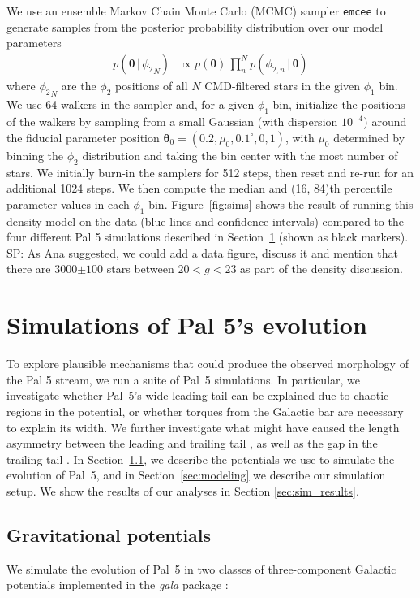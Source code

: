 \documentclass[twocolumn]{aastex62}
\newcommand{\package}[1]{\textsl{#1}}
\newcommand{\bs}[1]{\boldsymbol{#1}}
\newcommand{\given}{\,|\,}
\newcommand{\sa}[1]{{\color{magenta} SP: #1}}
\begin{document}
We use an ensemble Markov Chain Monte Carlo (MCMC) sampler \texttt{emcee} \citep{Foreman-Mackey:2013} to generate samples from the posterior probability distribution over our model parameters
\begin{align}
    p(\bs{\theta} \given {\phi_2}_N) &\propto
        p(\bs{\theta}) \, \prod_n^N p(\phi_{2, n} \given \bs{\theta})
\end{align}
where ${\phi_2}_N$ are the $\phi_2$ positions of all $N$ CMD-filtered stars in the given $\phi_1$ bin.
We use 64 walkers in the sampler and, for a given $\phi_1$ bin, initialize the positions of the walkers by sampling from a small Gaussian (with dispersion $10^{-4}$) around the fiducial parameter position $\bs{\theta}_0 = (0.2, \mu_0, 0.1^\circ, 0, 1)$, with $\mu_0$ determined by binning the $\phi_2$ distribution and taking the bin center with the most number of stars.
We initially burn-in the samplers for 512 steps, then reset and re-run for an additional 1024 steps.
We then compute the median and (16, 84)th percentile parameter values in each $\phi_1$ bin.
Figure~\ref{fig:sims} shows the result of running this density model on the data (blue lines and confidence intervals) compared to the four different Pal 5 simulations described in Section~\ref{sec:sim} (shown as black markers). \sa{As Ana suggested, we could add a data figure, discuss it and mention that there are 3000$\pm 100$ stars between $20<g<23$ as part of the density discussion}.


\section{Simulations of Pal 5's evolution}
\label{sec:sim}
To explore plausible mechanisms that could produce the observed morphology of the Pal 5 stream, we run a suite of Pal~5 simulations.
In particular, we investigate whether Pal~5's wide leading tail can be explained due to chaotic regions in the potential, or whether torques from the Galactic bar are necessary to explain its width. We further investigate what might have caused the length asymmetry between the leading and trailing tail , as well as the gap in the trailing tail .
In Section~\ref{sec:potential}, we describe the potentials we use to simulate the evolution of Pal~5, and in Section~\ref{sec:modeling} we describe our simulation setup.
We show the results of our analyses in Section \ref{sec:sim_results}.

\subsection{Gravitational potentials}
\label{sec:potential}
We simulate the evolution of Pal~5 in two classes of three-component Galactic potentials implemented in the  \package{gala} package \citep{gala}:
\end{document}
